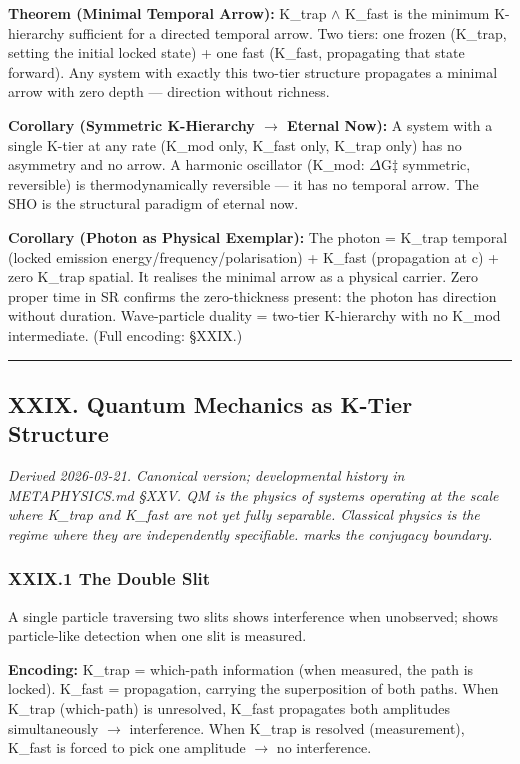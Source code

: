 \documentclass[12pt,a4paper]{article}
\begin{document}
\textbf{Theorem (Minimal Temporal Arrow):} K\_trap $\land$ K\_fast is the minimum K-hierarchy sufficient for a directed temporal arrow. Two tiers: one frozen (K\_trap, setting the initial locked state) + one fast (K\_fast, propagating that state forward). Any system with exactly this two-tier structure propagates a minimal arrow with zero depth --- direction without richness.

\textbf{Corollary (Symmetric K-Hierarchy $\rightarrow$ Eternal Now):} A system with a single K-tier at any rate (K\_mod only, K\_fast only, K\_trap only) has no asymmetry and no arrow. A harmonic oscillator (K\_mod: $\Delta$G‡ symmetric, reversible) is thermodynamically reversible --- it has no temporal arrow. The SHO is the structural paradigm of eternal now.

\textbf{Corollary (Photon as Physical Exemplar):} The photon = K\_trap temporal (locked emission energy/frequency/polarisation) + K\_fast (propagation at c) + zero K\_trap spatial. It realises the minimal arrow as a physical carrier. Zero proper time in SR confirms the zero-thickness present: the photon has direction without duration. Wave-particle duality = two-tier K-hierarchy with no K\_mod intermediate. (Full encoding: §XXIX.)

\begin{center}
\rule{0.5\textwidth}{0.4pt}
\end{center}

\subsection{XXIX. Quantum Mechanics as K-Tier Structure}

\emph{Derived 2026-03-21. Canonical version; developmental history in METAPHYSICS.md §XXV. QM is the physics of systems operating at the scale where K\_trap and K\_fast are not yet fully separable. Classical physics is the regime where they are independently specifiable. \hbar marks the conjugacy boundary.}

\subsubsection{XXIX.1 The Double Slit}

A single particle traversing two slits shows interference when unobserved; shows particle-like detection when one slit is measured.

\textbf{Encoding:} K\_trap = which-path information (when measured, the path is locked). K\_fast = propagation, carrying the superposition of both paths. When K\_trap (which-path) is unresolved, K\_fast propagates both amplitudes simultaneously $\rightarrow$ interference. When K\_trap is resolved (measurement), K\_fast is forced to pick one amplitude $\rightarrow$ no interference.
\end{document}
